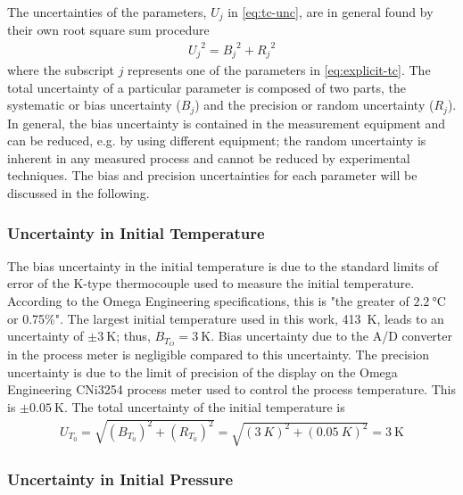 \documentclass[../main.tex]{subfiles}
\begin{document}
The uncertainties of the parameters, $U_j$ in \cref{eq:tc-unc}, are in
general found by their own root square sum procedure
%
\begin{align}
{U_j}^2 = {B_j}^2 + {R_j}^2
\end{align}
%
where the subscript $j$ represents one of the parameters in \cref{eq:explicit-tc}.
The total uncertainty of a particular parameter is composed of
two parts, the systematic or bias uncertainty ($B_j$) and the
precision or random uncertainty ($R_j$). In general, the bias
uncertainty is contained in the measurement equipment and can
be reduced, e.g. by using different equipment; the random uncertainty
is inherent in any measured process and cannot be reduced by
experimental techniques. The bias and precision uncertainties
for each parameter will be discussed in the following.

\subsubsection{Uncertainty in Initial Temperature}

The bias uncertainty in the initial temperature is due to the standard
limits of error of the K-type thermocouple used to measure the
initial temperature. According to the Omega Engineering
specifications, this is "the greater
of $\SI{2.2}{\degreeCelsius}$ or 0.75\%". The largest initial temperature
used in this work, \SI{413}{\kelvin}, leads to an uncertainty of
$\pm \SI{3}{\kelvin}$; thus, $B_{T_O}=\SI{3}{\kelvin}$. Bias uncertainty
due to the A/D converter in the process meter is negligible compared
to this uncertainty.
The precision uncertainty is due to the limit of precision of
the display on the Omega Engineering CNi3254 process meter used
to control the process temperature. This is $\pm\SI{0.05}{\kelvin}$.
The total uncertainty of the initial temperature is
%
\begin{align}
U_{T_0} = \sqrt{\left(B_{T_0}\right)^2 + \left(R_{T_0}\right)^2} = \sqrt{\left(\SI{3}{K}\right)^2 + \left(\SI{0.05}{K}\right)^2} = \SI{3}{\kelvin}
\end{align}

\subsubsection{Uncertainty in Initial Pressure}
\label{sec:unc-p0}
\end{document}
